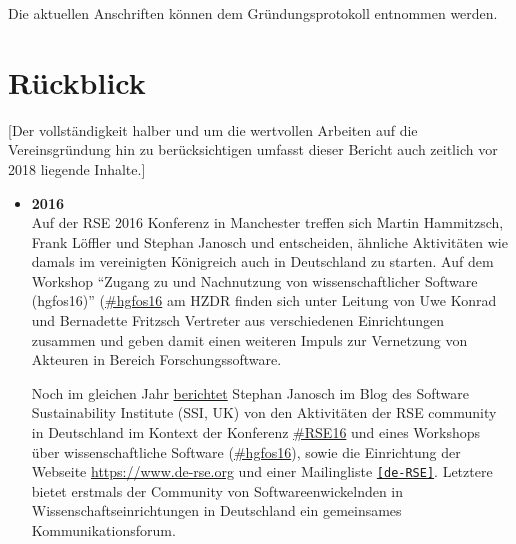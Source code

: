 Die aktuellen Anschriften können dem Gründungsprotokoll entnommen werden.

\section{Rückblick}

[Der vollständigkeit halber und um die wertvollen Arbeiten auf die Vereinsgründung hin zu berücksichtigen umfasst dieser Bericht auch zeitlich vor 2018 liegende Inhalte.]

\begin{itemize}
 \item \textbf{2016}\\
 Auf der RSE 2016 Konferenz in Manchester treffen sich Martin Hammitzsch, Frank Löffler und Stephan Janosch und entscheiden, ähnliche Aktivitäten wie damals im vereinigten Königreich auch in Deutschland zu starten. Auf dem Workshop "`Zugang zu und Nachnutzung von wissenschaftlicher Software (hgfos16)"' (\href{https://twitter.com/hashtag/hgfos16}{\#hgfos16} am HZDR finden sich unter Leitung von Uwe Konrad und Bernadette Fritzsch Vertreter aus verschiedenen Einrichtungen zusammen und geben damit einen weiteren Impuls zur Vernetzung von Akteuren in Bereich Forschungssoftware.
 
 Noch im gleichen Jahr \href{https://www.software.ac.uk/blog/2016-12-19-research-software-germany-brief-report-efforts-autumn-2016}{berichtet} Stephan Janosch im Blog des Software Sustainability Institute (SSI, UK) von den Aktivitäten der RSE community in Deutschland im Kontext der Konferenz \href{https://ukrse.github.io/conf2016.html}{\#RSE16} und eines Workshops über wissenschaftliche Software (\href{https://twitter.com/hashtag/hgfos16}{\#hgfos16}), sowie die Einrichtung der Webseite \href{https://www.de-rse.org}{https://www.de-rse.org} und einer Mailingliste \href{https://ml-cgn04.ispgateway.de/mailman/listinfo/liste_de-rse.org}{\texttt{[de-RSE]}}.
 Letztere bietet erstmals der Community von Softwareenwickelnden in Wissenschaftseinrichtungen in Deutschland ein gemeinsames Kommunikationsforum.


\end{itemize}
